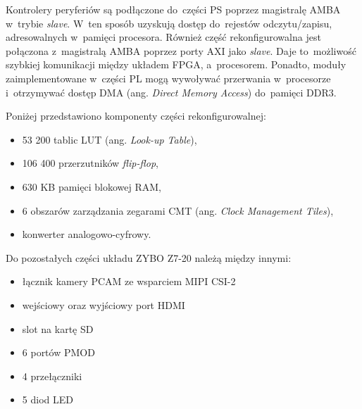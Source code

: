 Kontrolery peryferiów są podłączone do~części PS poprzez magistralę AMBA w~trybie \textit{slave}. W~ten sposób uzyskują dostęp do~rejestów odczytu/zapisu, adresowalnych w~pamięci procesora. Również część rekonfigurowalna jest połączona z~magistralą AMBA poprzez porty AXI jako \textit{slave}. Daje to~możliwość szybkiej komunikacji między układem FPGA, a~procesorem. Ponadto, moduły zaimplementowane w~części PL mogą wywoływać przerwania w~procesorze i~otrzymywać dostęp DMA (ang. \textit{Direct Memory Access}) do~pamięci DDR3.\par
Poniżej przedstawiono komponenty części rekonfigurowalnej:
\begin{itemize}
	\item 53 200 tablic LUT (ang. \textit{Look-up Table}),
	\item 106 400 przerzutników \textit{flip-flop},
	\item 630 KB pamięci blokowej RAM,
	\item 6 obszarów zarządzania zegarami CMT (ang. \textit{Clock Management Tiles}),
	\item konwerter analogowo-cyfrowy.
\end{itemize}
Do pozostałych części układu ZYBO Z7-20 należą między innymi:
\begin{itemize}
	\item łącznik kamery PCAM ze wsparciem MIPI CSI-2
	\item wejściowy oraz wyjściowy port HDMI
	\item slot na kartę SD
	\item 6 portów PMOD
	\item 4 przełączniki
	\item 5 diod LED
\end{itemize}
